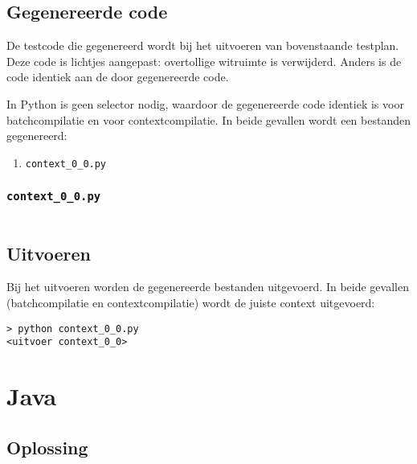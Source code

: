 \inputminted{python}{sources/echo-function/correct.py}

\subsection{Gegenereerde code}\label{subsec:echo-function-python-gegenereerde-code}

De testcode die gegenereerd wordt bij het uitvoeren van bovenstaande testplan.
Deze code is lichtjes aangepast: overtollige witruimte is verwijderd.
Anders is de code identiek aan de door \tested{} gegenereerde code.

In Python is geen selector nodig, waardoor de gegenereerde code identiek is voor batchcompilatie en voor contextcompilatie.
In beide gevallen wordt een bestanden gegenereerd:

\begin{enumerate}
    \item \texttt{context\_0\_0.py}
\end{enumerate}

\subsubsection{\texttt{context\_0\_0.py}}

\inputminted{python}{sources/echo-function/context_0_0.py}

\subsection{Uitvoeren}\label{subsec:echo-function-python-uitvoeren}

Bij het uitvoeren worden de gegenereerde bestanden uitgevoerd.
In beide gevallen (batchcompilatie en contextcompilatie) wordt de juiste context uitgevoerd:

\begin{verbatim}
> python context_0_0.py
<uitvoer context_0_0>
\end{verbatim}

\section{Java}\label{sec:echo-function-java}

\subsection{Oplossing}\label{subsec:echo-function-java-oplossing}

